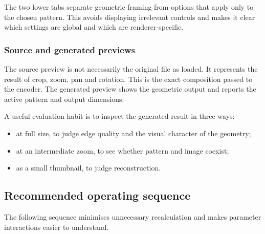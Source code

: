 The two lower tabs separate geometric framing from options that apply only to the chosen pattern. This avoids displaying irrelevant controls and makes it clear which settings are global and which are renderer-specific.

\subsubsection{Source and generated previews}

The source preview is not necessarily the original file as loaded. It represents the result of crop, zoom, pan and rotation. This is the exact composition passed to the encoder. The generated preview shows the geometric output and reports the active pattern and output dimensions.

A useful evaluation habit is to inspect the generated result in three ways:

\begin{itemize}
  \item at full size, to judge edge quality and the visual character of the geometry;
  \item at an intermediate zoom, to see whether pattern and image coexist;
  \item as a small thumbnail, to judge reconstruction.
\end{itemize}

\subsection{Recommended operating sequence}

The following sequence minimises unnecessary recalculation and makes parameter interactions easier to understand.

